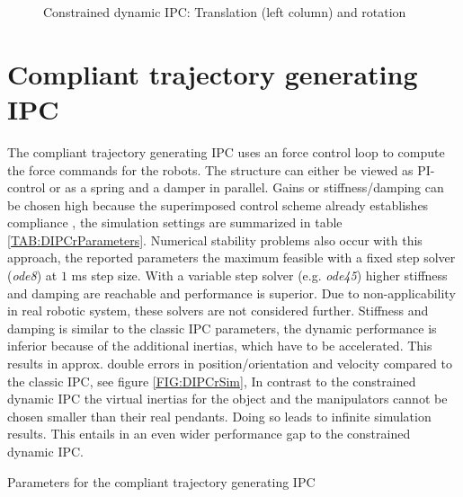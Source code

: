 \documentclass[a4paper,twoside, openright,12pt]{report}
\begin{document}
{\begin{figure}

\label{FIG:DIPCcSim}
\caption[Simulation results of the constrained dynamic IPC]{Constrained dynamic IPC: Translation (left column) and rotation}
\end{figure}

\section{Compliant trajectory generating IPC}
The compliant trajectory generating IPC uses an force control loop to compute the force commands for the robots. The structure can either be viewed as PI-control or as a spring and a damper in parallel. Gains or stiffness/damping can be chosen high because the superimposed control scheme already establishes compliance \cite{Caccavale_08}, the simulation settings are summarized in table \ref{TAB:DIPCrParameters}. Numerical stability problems also occur with this approach, the reported parameters   the maximum feasible with a fixed step solver (\emph{ode8}) at $1$ ms step size. With a variable step solver (e.g. \emph{ode45}) higher stiffness and damping are reachable and performance is superior. Due to non-applicability in real robotic system, these solvers are not considered further. Stiffness and damping is similar to the classic IPC parameters, the dynamic performance is inferior because of the additional inertias, which have to be accelerated. This results in approx. double errors in position/orientation and velocity compared to the classic IPC, see figure \ref{FIG:DIPCrSim}, In contrast to the constrained dynamic IPC the virtual inertias for the object and the manipulators cannot be chosen smaller than their real pendants. Doing so leads to infinite simulation results. This entails in an even wider performance gap to the constrained dynamic IPC.

\begin{table}
	\centering
	\caption[Parameters for the compliant trajectory generating IPC]{Parameters for the compliant trajectory generating IPC}\vspace{10pt}
	\label{TAB:DIPCrParameters}
	

\end{table}}
\end{document}

